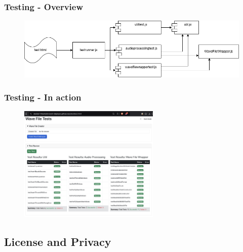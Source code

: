 \begin{frame}
    \frametitle{Testing - Overview}
    \begin{figure}[H]
        \centering
        \includegraphics[width=1\textwidth]{../assets/overview_test_framework.png}
    \end{figure}
\end{frame}

\begin{frame}
    \frametitle{Testing - In action}
    \begin{figure}[H]
        \centering
        \includegraphics[width=0.6\textwidth]{../assets/js_test_framework_in_browser.png}
    \end{figure}
\end{frame}

\subsection{License and Privacy}\label{subsec:license-and-privacy}

